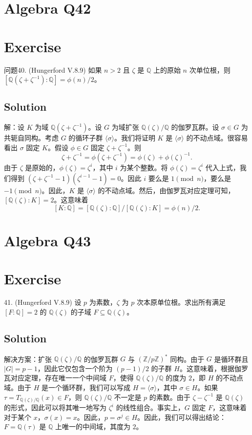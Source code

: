 \documentclass[12pt]{book}
\begin{document}
\section{Algebra Q42}
\section*{Exercise}
问题40. (Hungerford V.8.9) 如果 $n > 2$ 且 $\zeta$ 是 $\mathbb{Q}$ 上的原始 $n$ 次单位根，则 $[\mathbb{Q}(\zeta + \zeta^{-1}) : \mathbb{Q}] = \phi(n)/2$。



\subsection*{Solution}
解：设 $K$ 为域 $\mathbb{Q}(\zeta+\zeta^{-1})$。设 $G$ 为域扩张 $\mathbb{Q}(\zeta)/\mathbb{Q}$ 的伽罗瓦群。设 $\sigma \in G$ 为共轭自同构。考虑 $G$ 的循环子群 $\langle \sigma \rangle$。我们将证明 $K$ 是 $\langle \sigma \rangle$ 的不动点域。很容易看出 $\sigma$ 固定 $K$。假设 $\phi \in G$ 固定 $\zeta + \zeta^{-1}$。则
\[\zeta + \zeta^{-1} = \phi(\zeta + \zeta^{-1}) = \phi(\zeta) + \phi(\zeta)^{-1}.\]
由于 $\zeta$ 是原始的，$\phi(\zeta) = \zeta^i$，其中 $i$ 为某个整数。将 $\phi(\zeta) = \zeta^i$ 代入上式，我们得到 $(\zeta+\zeta^{-1} - 1)(\zeta^{i-1} - 1) = 0$。因此 $i$ 要么是 $1 \pmod{n}$，要么是 $-1 \pmod{n}$。因此，$K$ 是 $\langle \sigma \rangle$ 的不动点域。然后，由伽罗瓦对应定理可知，$[\mathbb{Q}(\zeta): K] = 2$。这意味着
\[[K : \mathbb{Q}] = [\mathbb{Q}(\zeta) : \mathbb{Q}]/[\mathbb{Q}(\zeta) : K] = \phi(n)/2.\]
\newpage
\section{Algebra Q43}
\section*{Exercise}
41. (Hungerford V.8.9) 设 $p$ 为素数，$\zeta$ 为 $p$ 次本原单位根。求出所有满足 $[F : \mathbb{Q}] = 2$ 的 $\mathbb{Q}(\zeta)$ 的子域 $F \subseteq \mathbb{Q}(\zeta)$。



\subsection*{Solution}
解决方案：扩张 $\mathbb{Q}(\zeta)/\mathbb{Q}$ 的伽罗瓦群 $G$ 与 $(\mathbb{Z}/p\mathbb{Z})^*$ 同构。由于 $G$ 是循环群且 $|G| = p-1$，因此它仅包含一个阶为 $(p-1)/2$ 的子群 $H$。这意味着，根据伽罗瓦对应定理，存在唯一一个中间域 $F$，使得 $\mathbb{Q}(\zeta)/\mathbb{Q}$ 的度为 $2$，即 $H$ 的不动点域。由于 $H$ 是一个循环群，我们可以写成 $H = \langle \sigma \rangle$，其中 $\sigma \in H$。如果 $\tau = T_{\mathbb{Q}(\zeta)/\mathbb{Q}}(x) \in F$，则 $\mathbb{Q}(\zeta)/\mathbb{Q}$ 不一定是 $p$ 的素数。由于 $\zeta - \zeta^{-1}$ 是 $\mathbb{Q}(\zeta)$ 的形式，因此可以将其唯一地写为 $\zeta^i$ 的线性组合。事实上，$G$ 固定 $F$，这意味着对于某个 $x$，$\sigma(x) = x$。因此，$p = \sigma^j \in H$。因此，我们可以得出结论：$F = \mathbb{Q}(\tau)$ 是 $\mathbb{Q}$ 上唯一的中间域，其度为 $2$。
\newpage
\end{document}
